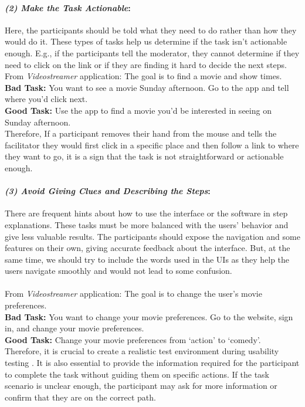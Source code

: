 \paragraph{\textit{(2) Make the Task Actionable}:}
Here, the participants should be told what they need to do rather than how they would do it.
These types of tasks help us determine if the task isn’t actionable enough. 
E.g., if the participants tell the moderator, they cannot determine if they need to click on the link or if they are finding it hard to decide the next steps. \\
From \textit{Videostreamer} application: The goal is to find a movie and show times. \\
\textbf{Bad Task: } You want to see a movie Sunday afternoon. Go to the app and tell where you’d click next. \\
\textbf{Good Task: } Use the app to find a movie you’d be interested in seeing on Sunday afternoon. \\
Therefore, If a participant removes their hand from the mouse and tells the facilitator they would first click in a specific place and then follow a link to where they want to go, it is a sign that the task is not straightforward or actionable enough.

\paragraph{\textit{(3) Avoid Giving Clues and Describing the Steps}:}
There are frequent hints about how to use the interface or the software in step explanations.
These tasks must be more balanced with the users' behavior and give less valuable results.   
The participants should expose the navigation and some features on their own, giving accurate feedback about the interface.
But, at the same time, we should try to include the words used in the UIs as they help the users navigate smoothly and would not lead to some confusion. \\\\
From \textit{Videostreamer} application: The goal is to change the user's movie preferences. \\
\textbf{Bad Task: } You want to change your movie preferences. Go to the website, sign in, and change your movie preferences. \\
\textbf{Good Task: } Change your movie preferences from `action' to `comedy'. \\

Therefore, it is crucial to create a realistic test environment during usability testing \cite{article:usability:doesburg}. 
It is also essential to provide the information required for the participant to complete the task without guiding them on specific actions. 
If the task scenario is unclear enough, the participant may ask for more information or confirm that they are on the correct path.

